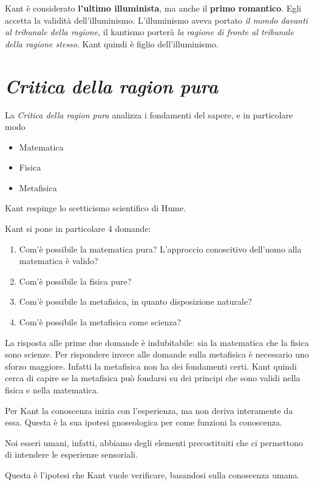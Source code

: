 \documentclass[a4paper, twoside, titlepage]{book}
\begin{document}
Kant è considerato \textbf{l’ultimo illuminista}, ma anche il \textbf{primo romantico}. Egli accetta la validità dell’illuminismo.
L’illuminismo aveva portato \textit{il mondo davanti al tribunale della ragione}, il kantismo porterà \textit{la ragione di fronte al tribunale della ragione stesso}.
Kant quindi è figlio dell’illuminismo.

\chapter{\textit{Critica della ragion pura}}

La \textit{Critica della ragion pura} analizza i fondamenti del sapere, e in particolare modo
\begin{itemize}
\item Matematica
\item Fisica
\item Metafisica
\end{itemize}

Kant respinge lo scetticismo scientifico di Hume.

Kant si pone in particolare 4 domande:
\begin{enumerate}
\item Com’è possibile la matematica pura? L’approccio conoscitivo dell’uomo alla matematica è valido?
\item Com’è possibile la fisica pure?
\item Com’è possibile la metafisica, in quanto disposizione naturale?
\item Com’è possibile la metafisica come scienza?
\end{enumerate}

La risposta alle prime due domande è indubitabile: sia la matematica che la fisica sono scienze.
Per rispondere invece alle domande sulla metafisica è necessario uno sforzo maggiore. Infatti la metafisica non ha dei fondamenti certi.
Kant quindi cerca di capire se la metafisica può fondarsi su dei principi che sono validi nella fisica e nella matematica.

Per Kant la conoscenza inizia con l’esperienza, ma non deriva interamente da essa.
Questa è la sua ipotesi gnoseologica per come funzioni la conoscenza.

Noi esseri umani, infatti, abbiamo degli elementi precostituiti che ci permettono di intendere le esperienze sensoriali.

Questa è l’ipotesi che Kant vuole verificare, basandosi sulla conoscenza umana.
\end{document}
